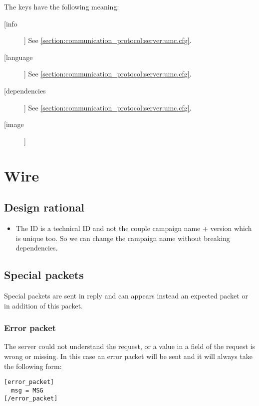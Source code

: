 The keys have the following meaning:
\begin{description}
\item[[info]]
	See \cref{section:communication_protocol:server:umc.cfg}.

\item[[language]]
  See \cref{section:communication_protocol:server:umc.cfg}.

\item[[dependencies]]
	See \cref{section:communication_protocol:server:umc.cfg}.

\item[[image]]

\end{description}

\section{Wire}
\label{section:communication_protocol:wire}

\subsection{Design rational}

\begin{itemize}
 \item The ID is a technical ID and not the couple campaign name + version which is unique too. So we can change the campaign name without breaking dependencies.

\end{itemize}


\subsection{Special packets}
\label{wire:specialpackets}

Special packets are sent in reply and can appears instead an expected packet or in addition of this packet.

\subsubsection{Error packet}
\label{wire:specialpackets:errorpacket}

 The server could not understand the request, or a value in a field of the request is wrong or missing.
In this case an error packet will be sent and it will always take the following form:
\begin{lstlisting}
[error_packet]
  msg = MSG
[/error_packet]
\end{lstlisting}

